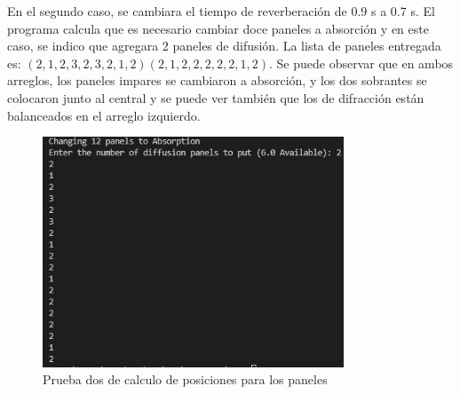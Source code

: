 \FloatBarrier
En el segundo caso, se cambiara el tiempo de reverberación de 0.9 s a 0.7 s. El programa calcula que es necesario cambiar doce paneles a absorción y en este caso, se indico que agregara 2 paneles de difusión. La lista de paneles entregada es: $(2,1,2,3,2,3,2,1,2) (2,1,2,2,2,2,2,1,2)$. Se puede observar que en ambos arreglos, los paneles impares se cambiaron a absorción, y los dos sobrantes se colocaron junto al central y se puede ver también que los de difracción están balanceados en el arreglo izquierdo. \\
\begin{figure}[!htb]
    \centering
    \includegraphics[width=0.8\textwidth]{imagenes/PanelsExample2.jpg}
    \caption{Prueba dos de calculo de posiciones para los paneles}
    \label{fig:PanelsExample2}
\end{figure}
\FloatBarrier

